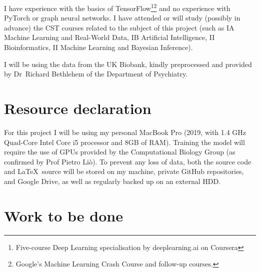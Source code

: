 \documentclass[12pt,a4paper,twoside]{article}
\begin{document}
I have experience with the basics of TensorFlow\footnote{Five-course Deep Learning specialisation by deeplearning.ai on Coursera}\footnote{Google's Machine Learning Crash Course and follow-up courses.} and no experience with PyTorch or graph neural networks. I have attended or will study (possibly in advance) the CST courses related to the subject of this project (such as IA Machine Learning and Real-World Data, IB Artificial Intelligence, II Bioinformatics, II Machine Learning and Bayesian Inference).

I will be using the data from the UK Biobank, kindly preprocessed and provided by Dr~Richard Bethlehem of the Department of Psychiatry.

\section*{Resource declaration}

For this project I will be using my personal MacBook Pro (2019, with 1.4 GHz Quad-Core Intel Core i5 processor and 8GB of RAM). Training the model will require the use of GPUs provided by the Computational Biology Group (as confirmed by Prof Pietro Liò). To prevent any loss of data, both the source code and \LaTeX\ source will be stored on my machine, private GitHub repositories, and Google Drive, as well as regularly backed up on an external HDD.

\section*{Work to be done}
\label{section:work}

\end{document}
